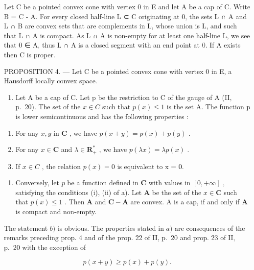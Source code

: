 Let C be a pointed convex cone with vertex 0 in E and let A be a cap of C. Write B = C - A. For every closed half-line L ⊂ C originating at 0, the sets L ∩ A and L ∩ B are convex sets that are complements in L, whose union is L, and such that L ∩ A is compact. As L ∩ A is non-empty for at least one half-line L, we see that 0 ∈ A, thus L ∩ A is a closed segment with an end point at 0. If A exists then C is proper.

PROPOSITION 4. --- Let C be a pointed convex cone with vertex 0 in E, a Hausdorff locally convex space.

\begin{enumerate}
\def\labelenumi{\alph{enumi})}
\tightlist
\item
  Let A be a cap of C. Let p be the restriction to C of the gauge of A (II, p.~20). The set of the \(x \in C\) such that \(p(x) \leqslant 1\) is the set A. The function p is lower semicontinuous and has the following properties :
\end{enumerate}

\begin{enumerate}
\def\labelenumi{(\roman{enumi})}
\item
  For any \(x, y\) in \(\mathbf{C}\) , we have \(p(x + y) = p(x) + p(y)\) .
\item
  For any \(x \in \mathbf{C}\) and \(\lambda \in \mathbf{R}_{+}^{*}\) , we have \(p(\lambda x) = \lambda p(x)\) .
\item
  If \(x \in C\) , the relation \(p(x) = 0\) is equivalent to x = 0.
\end{enumerate}

\begin{enumerate}
\def\labelenumi{\alph{enumi})}
\setcounter{enumi}{1}
\tightlist
\item
  Conversely, let \(p\) be a function defined in \(\mathbf{C}\) with values in \([0, +\infty]\) , satisfying the conditions (i), (ii) of a). Let \(\mathbf{A}\) be the set of the \(x \in \mathbf{C}\) such that \(p(x) \leqslant 1\) . Then \(\mathbf{A}\) and \(\mathbf{C} - \mathbf{A}\) are convex. A is a cap, if and only if \(\mathbf{A}\) is compact and non-empty.
\end{enumerate}

The statement \(b)\) is obvious. The properties stated in \(a)\) are consequences of the remarks preceding prop. 4 and of the prop. 22 of II, p.~20 and prop. 23 of II, p.~20 with the exception of

\[
p (x + y) \geqslant p (x) + p (y).
\]

